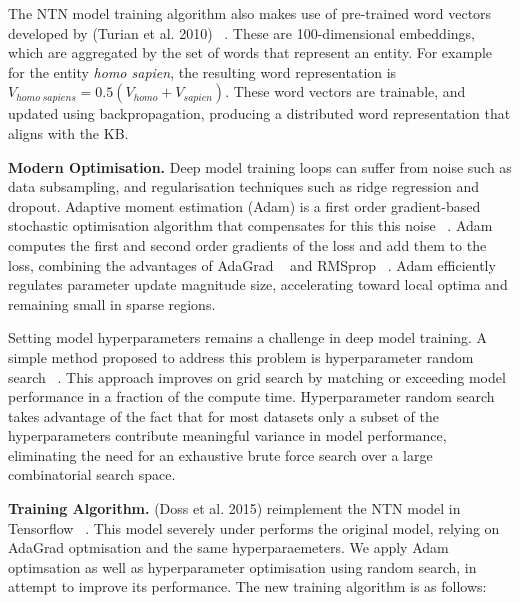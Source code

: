 The NTN model training algorithm also makes use of pre-trained word vectors developed by (Turian et al. 2010) ~\citep{turian2010word}. These are 100-dimensional embeddings, which are aggregated by the set of words that represent an entity. For example for the entity \textit{homo sapien}, the resulting word representation is $V_{homo \; sapiens} = 0.5(V_{homo} + V_{sapien})$. These word vectors are trainable, and updated using backpropagation, producing a distributed word representation that aligns with the KB. \bigskip

\textbf{Modern Optimisation.} Deep model training loops can suffer from noise such as data subsampling, and regularisation techniques such as ridge regression and dropout. Adaptive moment estimation (Adam) is a first order gradient-based stochastic optimisation algorithm that compensates for this this noise ~\citep{kingma2014adam}. Adam computes the first and second order gradients of the loss and add them to the loss, combining the advantages of AdaGrad ~\citep{duchi2011adaptive} and RMSprop ~\citep{tieleman2012lecture}. Adam efficiently regulates parameter update magnitude size, accelerating toward local optima and remaining small in sparse regions. \bigskip

Setting model hyperparameters remains a challenge in deep model training. A simple method proposed to address this problem is hyperparameter random search ~\citep{bergstra2012random}. This approach improves on grid search by matching or exceeding model performance in a fraction of the compute time. Hyperparameter random search takes advantage of the fact that for most datasets only a subset of the hyperparameters contribute meaningful variance in model performance, eliminating the need for an exhaustive brute force search over a large combinatorial search space. \bigskip

\textbf{Training Algorithm.} (Doss et al. 2015) reimplement the NTN model in Tensorflow ~\citep{abadi2016tensorflow}. This model severely under performs the original model, relying on AdaGrad optmisation and the same hyperparaemeters. We apply Adam optimsation as well as hyperparameter optimisation using random search, in attempt to improve its performance. The new training algorithm is as follows: \bigbreak

